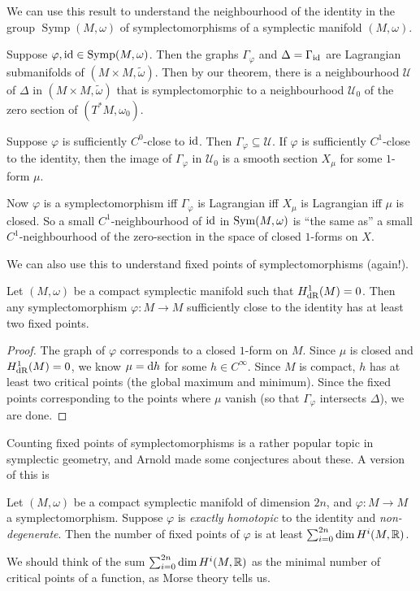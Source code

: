 \documentclass[a4paper]{article}
\DeclareMathOperator{\Symp}{Symp}
\begin{document}
\begin{eg}
  We can use this result to understand the neighbourhood of the identity in the group $\Symp(M, \omega)$ of symplectomorphisms of a symplectic manifold $(M, \omega)$.

  Suppose $\varphi, \id \in \Symp(M, \omega)$. Then the graphs $\Gamma_\varphi$ and $\Delta = \Gamma_{\operatorname{id}}$ are Lagrangian submanifolds of $(M \times M, \tilde{\omega})$. Then by our theorem, there is a neighbourhood $\mathcal{U}$ of $\Delta$ in $(M \times M, \tilde{\omega})$ that is symplectomorphic to a neighbourhood $\mathcal{U}_0$ of the zero section of $(T^*M, \omega_0)$.

  Suppose $\varphi$ is sufficiently $C^0$-close to $\operatorname{id}$. Then $\Gamma_\varphi \subseteq \mathcal{U}$. If $\varphi$ is sufficiently $C^1$-close to the identity, then the image of $\Gamma_\varphi$ in $\mathcal{U}_0$ is a smooth section $X_\mu$ for some $1$-form $\mu$.

  Now $\varphi$ is a symplectomorphism iff $\Gamma_\varphi$ is Lagrangian iff $X_\mu$ is Lagrangian iff $\mu$ is closed. So a small $C^1$-neighbourhood of $\operatorname{id}$ in $\operatorname{Sym}(M, \omega)$ is ``the same as'' a small $C^1$-neighbourhood of the zero-section in the space of closed $1$-forms on $X$.
\end{eg}

We can also use this to understand fixed points of symplectomorphisms (again!).
\begin{thm}
  Let $(M, \omega)$ be a compact symplectic manifold such that $H^1_{\mathrm{dR}}(M) = 0$. Then any symplectomorphism $\varphi: M \to M$ sufficiently close to the identity has at least two fixed points.
\end{thm}

\begin{proof}
  The graph of $\varphi$ corresponds to a closed $1$-form on $M$. Since $\mu$ is closed and $H^1_{\mathrm{dR}}(M) = 0$, we know $\mu = \mathrm{d} h$ for some $h \in C^\infty$. Since $M$ is compact, $h$ has at least two critical points (the global maximum and minimum). Since the fixed points corresponding to the points where $\mu$ vanish (so that $\Gamma_\varphi$ intersects $\Delta$), we are done.
\end{proof}
Counting fixed points of symplectomorphisms is a rather popular topic in symplectic geometry, and Arnold made some conjectures about these. A version of this is
\begin{thm} %
  Let $(M, \omega)$ be a compact symplectic manifold of dimension $2n$, and $\varphi: M \to M$ a symplectomorphism. Suppose $\varphi$ is \emph{exactly homotopic} to the identity and \emph{non-degenerate}. Then the number of fixed points of $\varphi$ is at least $\sum_{i = 0}^{2n} \dim H^i(M, \mathbb{R})$.
\end{thm}
We should think of the sum $\sum_{i = 0}^{2n} \dim H^i(M, \mathbb{R})$ as the minimal number of critical points of a function, as Morse theory tells us.
\end{document}
